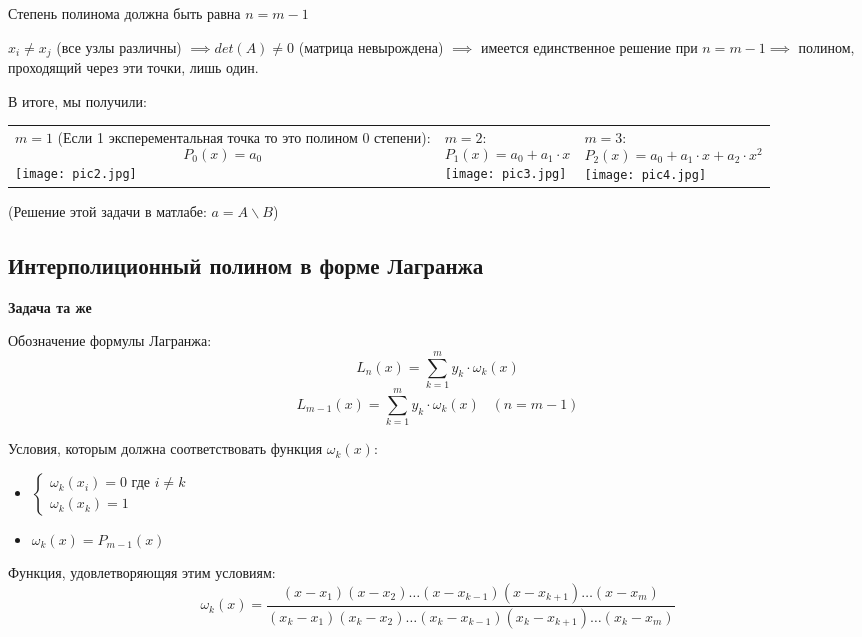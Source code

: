 \documentclass[12pt]{article}
\begin{document}
Степень полинома должна быть равна \( n = m - 1 \)

\( x_i \neq x_j \) (все узлы различны) \( \implies det(A) \neq 0 \)
(матрица невырождена) \( \implies \) имеется единственное решение при
\( n = m - 1 \implies \) полином, проходящий через эти точки, лишь один.

\vspace{10pt}

В итоге, мы получили:

\vspace{10pt}

\begin{tabularx}{\textwidth}{X|X|X}
	{
		\centering
		\( m = 1 \) (Если 1 эксперементальная точка то это полином 0 степени):
		\[ P_0(x) = a_0 \]
		\texttt{[image: pic2.jpg]}
	}
	 &
	{
			\centering
			\( m = 2 \):
			\[ P_1(x) = a_0 + a_1 \cdot x \]
			\texttt{[image: pic3.jpg]}
		}
	 &
	{
			\centering
			\( m = 3 \):
			\[ P_2(x) = a_0 + a_1 \cdot x + a_2 \cdot x^2 \]
			\texttt{[image: pic4.jpg]}
		}
\end{tabularx}

\vspace{10pt}

(Решение этой задачи в матлабе: \( a = A \backslash B \))

\subsection{Интерполиционный полином в форме Лагранжа}

\textbf{Задача та же}

Обозначение формулы Лагранжа:
\[
	L_n(x) = \sum_{k = 1}^{m} y_k \cdot \omega_k(x)
\]
\[
	L_{m-1}(x) = \sum_{k = 1}^{m} y_k \cdot \omega_k(x) \hspace{10pt} (n = m - 1)
\]

Условия, которым должна соответствовать функция \( \omega_k(x) \):
\begin{itemize}
	\centering
	\item
	      \(
	      \begin{cases}
		      \omega_k(x_i) = 0 \text{ где } i \neq k \\
		      \omega_k(x_k) = 1
	      \end{cases}
	      \)
	\item
	      \( \omega_k(x) = P_{m-1}(x) \)
\end{itemize}

Функция, удовлетворяющяя этим условиям:
\[
	\omega_k(x) = \frac
	{(x-x_1)(x-x_2)\ldots(x-x_{k-1})(x-x_{k+1})\ldots(x-x_m)}
	{(x_k-x_1)(x_k-x_2)\ldots(x_k-x_{k-1})(x_k-x_{k+1})\ldots(x_k-x_m)}
\]
\end{document}
